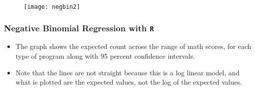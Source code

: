 \documentclass[MASTER.tex]{subfiles}
\begin{document}
\begin{frame}
\begin{figure}
\centering
\texttt{[image: negbin2]}
\caption{}
\label{fig:negbin2}
\end{figure}
	
\end{frame}
%		
%			
%			
%		
\begin{frame}[fragile]
	\frametitle{Negative Binomial Regression with \texttt{R} }
	\Large
	\begin{itemize}
\item The graph shows the expected count across the range of math scores, for each type of program along with 95 percent confidence intervals. 
\item Note that the lines are not straight because this is a log linear model, and what is plotted are the expected values, not the log of the expected values.
\end{itemize}
\end{frame}
\end{document}
